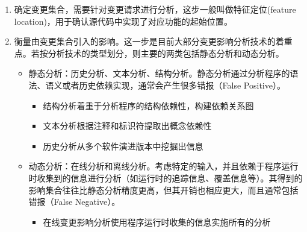 \begin{enumerate}
	\item 确定变更集合，需要针对变更请求进行分析，这步一般叫做特征定位(feature location)，用于确认源代码中实现了对应功能的起始位置\cite{biggerstaff1993concept}。
	\item 衡量由变更集合引入的影响。这一步是目前大部分变更影响分析技术的着重点。若按分析技术的类型划分，则主要的两类包括静态分析和动态分析。
	\begin{itemize}
	
	\item 静态分析：历史分析、文本分析、结构分析\cite{sun2012comparative,kagdi2007survey}。静态分析通过分析程序的语法、语义或者历史依赖实现，通常会产生很多错报（False Positive）。
		\begin{itemize}
		\item 结构分析着重于分析程序的结构依赖性，构建依赖关系图
		\item 文本分析根据注释和标识符提取出概念依赖性
		\item 历史分析从多个软件演进版本中挖掘出信息
		\end{itemize}
	
	\item 动态分析：在线分析和离线分析。考虑特定的输入，并且依赖于程序运行时收集到的信息进行分析（如运行时的追踪信息、覆盖信息等）\cite{law2003whole}。其得到的影响集合往往比静态分析精度更高，但其开销也相应更大，而且通常包括错报（False Negative）。
		\begin{itemize}
		\item 在线变更影响分析使用程序运行时收集的信息实施所有的分析
		\end{itemize}
		

		
	\end{itemize}
\end{enumerate}


